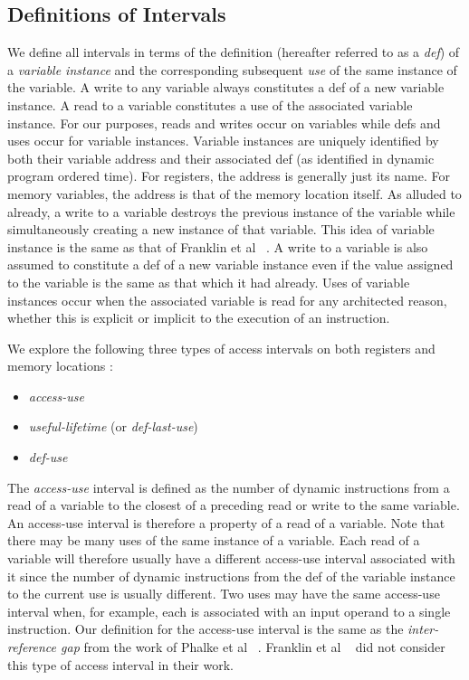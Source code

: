 \documentclass[10pt,dvips]{article}
\begin{document}
\subsection{Definitions of Intervals}
%
We define all intervals in terms of the definition
(hereafter referred to as a \textit{def}) of a
\textit{variable instance} 
and the corresponding subsequent \textit{use} of the
same instance of the variable.
A write to any variable always constitutes a def of a new
variable instance.
A read to a variable constitutes a use of the associated
variable instance.
For our purposes, reads and writes occur on variables while
defs and uses occur for variable instances.
Variable instances are uniquely identified by both their variable 
address and their associated def (as identified in dynamic program
ordered time).
For registers, the address is generally just its name.  
For memory variables, the address is that of the memory
location itself.  
As alluded to already, a write to a variable 
destroys the previous instance of the variable while simultaneously
creating a new instance of that variable.  
This idea of variable instance is the same as that of 
Franklin et al ~\cite{Franklin92}.
A write to a variable is also assumed to constitute a def of a new
variable instance even if the
value assigned to the variable is the same as that which it
had already.
Uses of variable instances occur when the associated variable
is read for any architected reason, whether this is explicit
or implicit to the execution of an instruction.

We explore the following three types of access intervals on
both registers and memory locations :
%
\begin{itemize}
\vspace{-0.1in}
\item \textit{access-use}
\vspace{-0.1in}
\item \textit{useful-lifetime} (or \textit{def-last-use})
\vspace{-0.1in}
\item \textit{def-use}
\vspace{-0.1in}
\end{itemize}
%
The \textit{access-use} interval is defined as the number of
dynamic instructions from a read of a variable to the closest
of a preceding read or write to the same variable.
An access-use interval is therefore a property of a read of a variable.
Note that there may be many uses of the same instance of a variable.
Each read of a variable will therefore
usually have a different access-use interval associated with it
since the number of dynamic instructions from the def
of the variable instance to the current use is usually different.
Two uses may have the same access-use interval when,
for example, each is associated with an input operand to a single
instruction.
Our definition for the access-use interval is the same as the
\textit{inter-reference gap} from the work of 
Phalke et al ~\cite{phalke95gap}.
Franklin et al ~\cite{Franklin92} did not consider this type
of access interval in their work.
\end{document}
